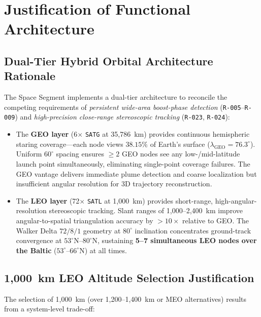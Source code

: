 \section{Justification of Functional Architecture}
\label{sec:functional_arch}

\subsection{Dual-Tier Hybrid Orbital Architecture Rationale}

The  Space Segment implements a dual-tier architecture to reconcile the competing requirements of \emph{persistent wide-area boost-phase detection} (\texttt{R-005}--\texttt{R-009}) and \emph{high-precision close-range stereoscopic tracking} (\texttt{R-023}, \texttt{R-024}):

\begin{itemize}
    \item The \textbf{GEO layer} (6$\times$ \texttt{SATG} at 35,786~km) provides continuous hemispheric staring coverage---each node views $38.15\%$ of Earth's surface ($\lambda_{\text{GEO}} = 76.3^\circ$). Uniform $60^\circ$ spacing ensures $\ge 2$ GEO nodes see any low-/mid-latitude launch point simultaneously, eliminating single-point coverage failures. The GEO vantage delivers immediate plume detection and coarse localization but insufficient angular resolution for 3D trajectory reconstruction.
    \item The \textbf{LEO layer} (72$\times$ \texttt{SATL} at 1,000~km) provides short-range, high-angular-resolution stereoscopic tracking. Slant ranges of 1,000--2,400~km improve angular-to-spatial triangulation accuracy by $> 10\times$ relative to GEO. The Walker Delta $72/8/1$ geometry at $80^\circ$ inclination concentrates ground-track convergence at $53^\circ$N--$80^\circ$N, sustaining \textbf{5--7 simultaneous LEO nodes over the Baltic} ($53^\circ$--$66^\circ$N) at all times.
\end{itemize}

\subsection{1,000~km LEO Altitude Selection Justification}

The selection of 1,000~km (over 1,200--1,400~km or MEO alternatives) results from a system-level trade-off:


